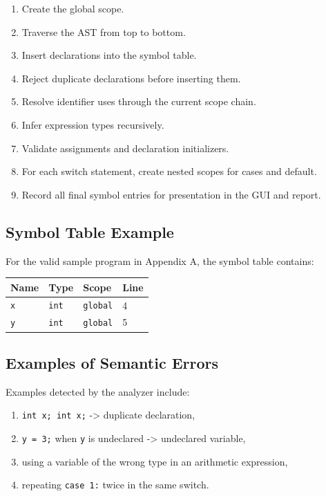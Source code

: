 \documentclass[12pt,a4paper]{article}
\begin{document}
\begin{enumerate}
    \item Create the global scope.
    \item Traverse the AST from top to bottom.
    \item Insert declarations into the symbol table.
    \item Reject duplicate declarations before inserting them.
    \item Resolve identifier uses through the current scope chain.
    \item Infer expression types recursively.
    \item Validate assignments and declaration initializers.
    \item For each switch statement, create nested scopes for cases and default.
    \item Record all final symbol entries for presentation in the GUI and report.
\end{enumerate}

\subsection{Symbol Table Example}
For the valid sample program in Appendix A, the symbol table contains:

\begin{center}
\begin{tabular}{|p{}|p{}|p{}|p{}|}
\hline
\textbf{Name} & \textbf{Type} & \textbf{Scope} & \textbf{Line} \\
\hline
\texttt{x} & \texttt{int} & \texttt{global} & 4 \\
\hline
\texttt{y} & \texttt{int} & \texttt{global} & 5 \\
\hline
\end{tabular}
\end{center}

\subsection{Examples of Semantic Errors}
Examples detected by the analyzer include:

\begin{enumerate}
    \item \texttt{int x; int x;} -> duplicate declaration,
    \item \texttt{y = 3;} when \texttt{y} is undeclared -> undeclared variable,
    \item using a variable of the wrong type in an arithmetic expression,
    \item repeating \texttt{case 1:} twice in the same switch.
\end{enumerate}
\end{document}
